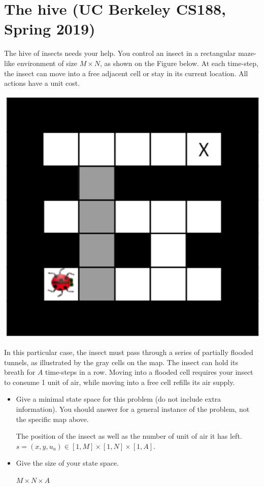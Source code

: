 \documentclass[11pt, a4paper]{article}
\begin{document}
\newpage

\section{The hive (UC Berkeley CS188, Spring 2019)}

The hive of insects needs your help. You control an insect in a rectangular maze-like environment of size $M \times N$, as shown on the Figure below. At each time-step, the insect can move into a free adjacent cell or stay in its current location. All actions have a unit cost.

\begin{center}
   \includegraphics[width=0.3\linewidth]{figures/e1_hive.png}
\end{center}

In this particular case, the insect must pass through a series of partially flooded tunnels, as illustrated by the gray cells on the map. The insect can hold its breath for $A$ time-steps in a row. Moving into a flooded cell requires your insect to consume 1 unit of air, while moving into a free cell refills its air supply.

\begin{itemize}
    \item Give a minimal state space for this problem (do not include extra information). You should answer for a general instance of the problem, not the specific map above.

    \begin{solution}
        The position of the insect  as well as the number of unit of air it has left. $s = (x, y, u_a) \in [1, M] \times [1, N] \times [1, A]$.
    \end{solution}
    
    \item Give the size of your state space.
    
    \begin{solution}
        $M\times N \times A$ 
    \end{solution}
\end{itemize}
\end{document}
